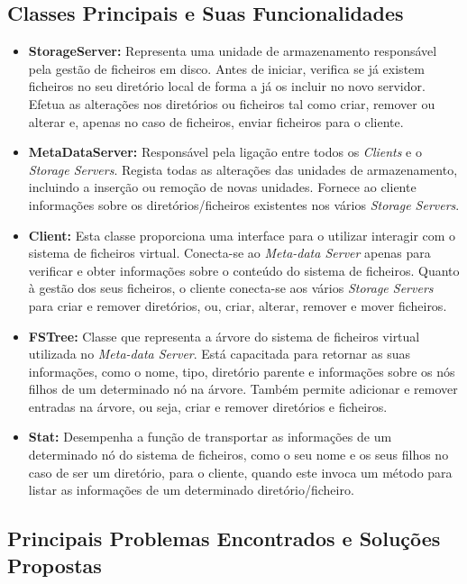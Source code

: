 \documentclass{article}
\begin{document}
\subsection{Classes Principais e Suas Funcionalidades}

\begin{itemize}
\item \textbf{StorageServer:} Representa uma unidade de armazenamento responsável pela gestão de ficheiros em disco. Antes de iniciar, verifica se já existem ficheiros no seu diretório local de forma a já os incluir no novo servidor. Efetua as alterações nos diretórios ou ficheiros tal como criar, remover ou alterar e, apenas no caso de ficheiros, enviar ficheiros para o cliente.
\item \textbf{MetaDataServer:} Responsável pela ligação entre todos os \textit{Clients} e o \textit{Storage Servers}. Regista todas as alterações das unidades de armazenamento, incluindo a inserção ou remoção de novas unidades. Fornece ao cliente informações sobre os diretórios/ficheiros existentes nos vários \textit{Storage Servers}.
\item \textbf{Client:} Esta classe proporciona uma interface para o utilizar interagir com o sistema de ficheiros virtual. Conecta-se ao \textit{Meta-data Server} apenas para verificar e obter informações sobre o conteúdo do sistema de ficheiros. Quanto à gestão dos seus ficheiros, o cliente conecta-se aos vários \textit{Storage Servers} para criar e remover diretórios, ou, criar, alterar, remover e mover ficheiros.
\item \textbf{FSTree:} Classe que representa a árvore do sistema de ficheiros virtual utilizada no \textit{Meta-data Server}. Está capacitada para retornar as suas informações, como o nome, tipo, diretório parente e informações sobre os nós filhos de um determinado nó na árvore. Também permite adicionar e remover entradas na árvore, ou seja, criar e remover diretórios e ficheiros.
\item \textbf{Stat:} Desempenha a função de transportar as informações de um determinado nó do sistema de ficheiros, como o seu nome e os seus filhos no caso de ser um diretório, para o cliente, quando este invoca um método para listar as informações de um determinado diretório/ficheiro. 
\end{itemize}


\subsection{Principais Problemas Encontrados e Soluções Propostas}
\end{document}
